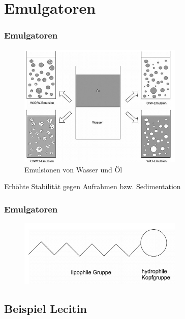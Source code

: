 \documentclass{beamer} %
\begin{document}
\section{Emulgatoren}
\begin{frame}
\frametitle{Emulgatoren}
\begin{figure}
\centering
\includegraphics[width = 0.7\textwidth]{Emulsionsarten.JPG}
\caption{Emulsionen von Wasser und Öl}
\end{figure}
\begin{block}{}
Erhöhte Stabilität gegen Aufrahmen bzw. Sedimentation
\end{block}
\end{frame}

\begin{frame}
\frametitle{Emulgatoren}
\begin{figure}
\centering
\includegraphics[width = 0.7\textwidth]{EmulgatorAllgemein.JPG}
\end{figure}
\end{frame}

\subsection{Beispiel Lecitin}
\end{document}
